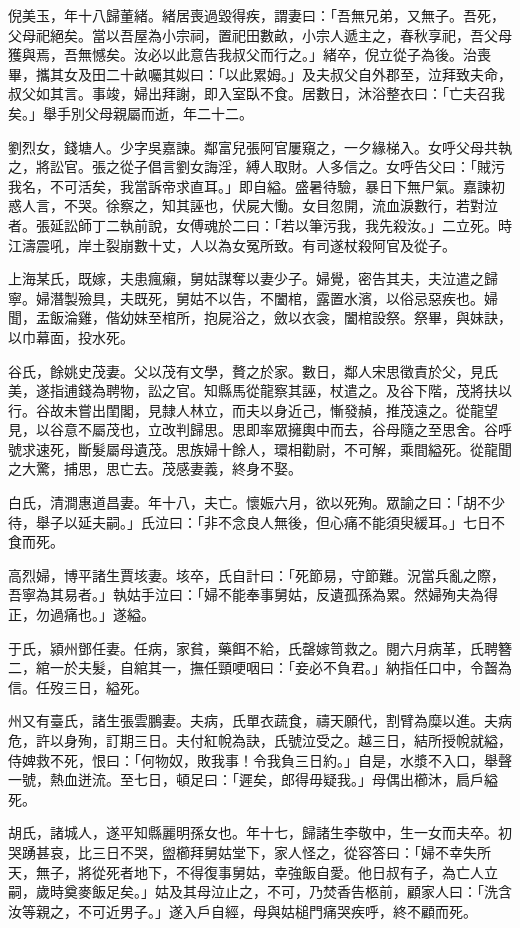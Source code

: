 \begin{pinyinscope}
倪美玉，年十八歸董緒。緒居喪過毀得疾，謂妻曰：「吾無兄弟，又無子。吾死，父母祀絕矣。當以吾屋為小宗祠，置祀田數畝，小宗人遞主之，春秋享祀，吾父母獲與焉，吾無憾矣。汝必以此意告我叔父而行之。」緒卒，倪立從子為後。治喪畢，攜其女及田二十畝囑其姒曰：「以此累姆。」及夫叔父自外郡至，泣拜致夫命，叔父如其言。事竣，婦出拜謝，即入室臥不食。居數日，沐浴整衣曰：「亡夫召我矣。」舉手別父母親屬而逝，年二十二。

劉烈女，錢塘人。少字吳嘉諫。鄰富兒張阿官屢窺之，一夕緣梯入。女呼父母共執之，將訟官。張之從子倡言劉女誨淫，縛人取財。人多信之。女呼告父曰：「賊污我名，不可活矣，我當訴帝求直耳。」即自縊。盛暑待驗，暴日下無尸氣。嘉諫初惑人言，不哭。徐察之，知其誣也，伏屍大慟。女目忽開，流血淚數行，若對泣者。張延訟師丁二執前說，女傅魂於二曰：「若以筆污我，我先殺汝。」二立死。時江濤震吼，岸土裂崩數十丈，人以為女冤所致。有司遂杖殺阿官及從子。

上海某氏，既嫁，夫患瘋癩，舅姑謀奪以妻少子。婦覺，密告其夫，夫泣遣之歸寧。婦潛製殮具，夫既死，舅姑不以告，不闔棺，露置水濱，以俗忌惡疾也。婦聞，盂飯淪雞，偕幼妹至棺所，抱屍浴之，斂以衣衾，闔棺設祭。祭畢，與妹訣，以巾幕面，投水死。

谷氏，餘姚史茂妻。父以茂有文學，贅之於家。數日，鄰人宋思徵責於父，見氏美，遂指逋錢為聘物，訟之官。知縣馬從龍察其誣，杖遣之。及谷下階，茂將扶以行。谷故未嘗出閨閣，見隸人林立，而夫以身近己，慚發赬，推茂遠之。從龍望見，以谷意不屬茂也，立改判歸思。思即率眾擁輿中而去，谷母隨之至思舍。谷呼號求速死，斷髮屬母遺茂。思族婦十餘人，環相勸尉，不可解，乘間縊死。從龍聞之大驚，捕思，思亡去。茂感妻義，終身不娶。

白氏，清澗惠道昌妻。年十八，夫亡。懷娠六月，欲以死殉。眾諭之曰：「胡不少待，舉子以延夫嗣。」氏泣曰：「非不念良人無後，但心痛不能須臾緩耳。」七日不食而死。

高烈婦，博平諸生賈垓妻。垓卒，氏自計曰：「死節易，守節難。況當兵亂之際，吾寧為其易者。」執姑手泣曰：「婦不能奉事舅姑，反遺孤孫為累。然婦殉夫為得正，勿過痛也。」遂縊。

于氏，潁州鄧任妻。任病，家貧，藥餌不給，氏罄嫁笥救之。閱六月病革，氏聘簪二，綰一於夫髮，自綰其一，撫任頸哽咽曰：「妾必不負君。」納指任口中，令齧為信。任歿三日，縊死。

州又有臺氏，諸生張雲鵬妻。夫病，氏單衣蔬食，禱天願代，割臂為糜以進。夫病危，許以身殉，訂期三日。夫付紅帨為訣，氏號泣受之。越三日，結所授帨就縊，侍婢救不死，恨曰：「何物奴，敗我事！令我負三日約。」自是，水漿不入口，舉聲一號，熱血迸流。至七日，頓足曰：「遲矣，郎得毋疑我。」母偶出櫛沐，扃戶縊死。

胡氏，諸城人，遂平知縣麗明孫女也。年十七，歸諸生李敬中，生一女而夫卒。初哭踴甚哀，比三日不哭，盥櫛拜舅姑堂下，家人怪之，從容答曰：「婦不幸失所天，無子，將從死者地下，不得復事舅姑，幸強飯自愛。他日叔有子，為亡人立嗣，歲時奠麥飯足矣。」姑及其母泣止之，不可，乃焚香告柩前，顧家人曰：「洗含汝等親之，不可近男子。」遂入戶自經，母與姑槌門痛哭疾呼，終不顧而死。


\end{pinyinscope}
